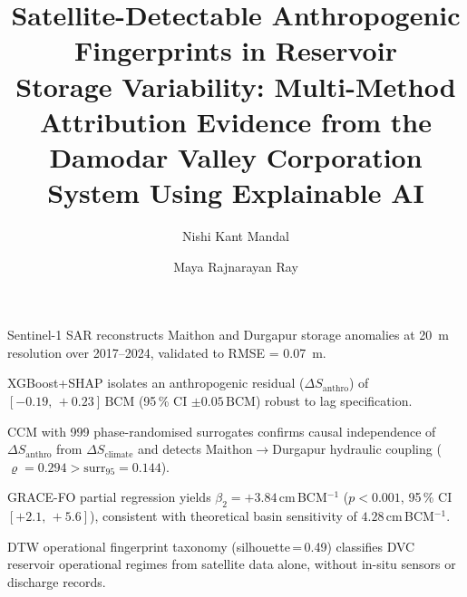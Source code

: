 \documentclass[preprint,12pt,authoryear]{elsarticle}
\newcommand{\dSclim}{\Delta S_{\mathrm{climate}}}
\newcommand{\dSanthro}{\Delta S_{\mathrm{anthro}}}
\newcommand{\BCM}{\,\mathrm{BCM}}
\begin{document}
\begin{frontmatter}

\title{Satellite-Detectable Anthropogenic Fingerprints in Reservoir\\
       Storage Variability: Multi-Method Attribution Evidence from the\\
       Damodar Valley Corporation System Using Explainable AI}

\author[bit]{Nishi Kant Mandal}

\author[bit]{Maya Rajnarayan Ray}

\address[bit]{Department of Civil Engineering, Birsa Institute of Technology
              (BIT) Sindri, Dhanbad 828123, Jharkhand, India}

\begin{highlights}
  \item Sentinel-1 SAR reconstructs Maithon and Durgapur storage anomalies
        at \SI{20}{\metre} resolution over 2017--2024, validated to RMSE = \SI{0.07}{\metre}.
  \item XGBoost+SHAP isolates an anthropogenic residual ($\dSanthro$) of
        $[-0.19,\,+0.23]\BCM$ (95\,\% CI $\pm 0.05\BCM$) robust to lag specification.
  \item CCM with 999 phase-randomised surrogates confirms causal independence
        of $\dSanthro$ from $\dSclim$ and detects Maithon$\to$Durgapur
        hydraulic coupling ($\varrho = 0.294 > \text{surr}_{95} = 0.144$).
  \item GRACE-FO partial regression yields $\beta_2 = +3.84$\,cm\,BCM$^{-1}$
        ($p < 0.001$, 95\,\% CI $[+2.1,\,+5.6]$), consistent with theoretical
        basin sensitivity of $4.28$\,cm\,BCM$^{-1}$.
  \item DTW operational fingerprint taxonomy (silhouette\,=\,0.49) classifies
        DVC reservoir operational regimes from satellite data alone,
        without in-situ sensors or discharge records.
\end{highlights}


\end{frontmatter}
\end{document}
